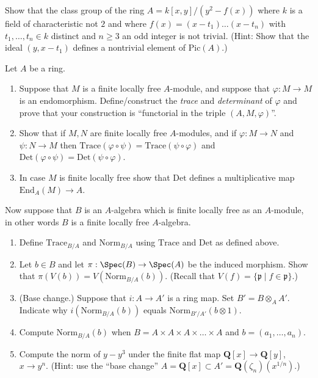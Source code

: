 \begin{exercise}
\label{exercise-class-group-not-trivial}
Show that the class group of the ring
$A = k[x, y]/(y^2 - f(x))$ where $k$ is a field of characteristic not $2$
and where $f(x) = (x - t_1) \ldots (x - t_n)$ with $t_1, \ldots, t_n \in k$
distinct and $n \geq 3$ an odd integer is not trivial. (Hint: Show that the
ideal $(y, x - t_1)$ defines a nontrivial element of $\text{Pic}(A)$.)
\end{exercise}

\begin{exercise}
\label{exercise-trace-det}
Let $A$ be a ring.
\begin{enumerate}
\item Suppose that $M$ is a finite locally free $A$-module, and
suppose that $\varphi : M \to M$ is an endomorphism. Define/construct
the {\it trace}  and {\it determinant} of $\varphi$ and prove that your
construction is ``functorial in the triple $(A, M, \varphi)$''.
\item Show that if $M, N$ are finite locally free $A$-modules,
and if $\varphi : M \to N$ and $\psi : N \to M$ then
$\text{Trace}(\varphi \circ \psi) = \text{Trace}(\psi \circ \varphi)$ and
$\text{Det}(\varphi \circ \psi) = \text{Det}(\psi \circ \varphi)$.
\item In case $M$ is finite locally free show that
$\text{Det}$ defines a multiplicative map $\text{End}_A(M) \to A$.
\end{enumerate}
\end{exercise}

\begin{exercise}
\label{exercise-trace-det-rings}
Now suppose that $B$ is an $A$-algebra which is finite
locally free as an $A$-module, in other words $B$ is a finite locally
free $A$-algebra.
\begin{enumerate}
\item Define $\text{Trace}_{B/A}$ and $\text{Norm}_{B/A}$ using
$\text{Trace}$ and $\text{Det}$ as defined above.
\item Let $b\in B$ and let $\pi : \Spec(B) \to \Spec(A)$ be
the induced morphism. Show that $\pi(V(b)) = V(\text{Norm}_{B/A}(b))$.
(Recall that $V(f) = \{ {\mathfrak p} \mid f \in {\mathfrak p}\}$.)
\item (Base change.) Suppose that $i : A \to A'$ is a ring map. Set
$B' = B \otimes_A A'$. Indicate why $i(\text{Norm}_{B/A}(b))$ equals
$\text{Norm}_{B'/A'}(b \otimes 1)$.
\item Compute $\text{Norm}_{B/A}(b)$ when
$B = A \times A \times A \times \ldots \times A$
and $b = (a_1, \ldots, a_n)$.
\item Compute the norm of $y-y^3$ under the finite flat
map ${\mathbf Q}[x] \to {\mathbf Q}[y]$, $x \to y^n$. (Hint: use
the ``base change''
$A = {\mathbf Q}[x] \subset A' = {\mathbf Q}(\zeta_n)(x^{1/n})$.)
\end{enumerate}
\end{exercise}



